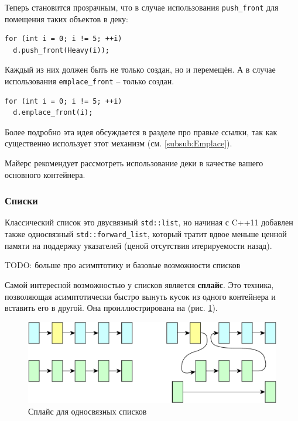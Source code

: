 \documentclass[a4paper,12pt,oneside]{article}
\begin{document}
Теперь становится прозрачным, что в случае использования \lstinline!push_front! для помещения таких объектов в деку:

\begin{lstlisting}
for (int i = 0; i != 5; ++i)
  d.push_front(Heavy(i));
\end{lstlisting}

Каждый из них должен быть не только создан, но и перемещён. А в случае использования \lstinline!emplace_front! -- только создан.

\begin{lstlisting}
for (int i = 0; i != 5; ++i)
  d.emplace_front(i);
\end{lstlisting}

Более подробно эта идея обсуждается в разделе про правые ссылки, так как существенно использует этот механизм (см. \ref{subsub:Emplace}).

Майерс \cite{effmoderncpp} рекомендует рассмотреть использование деки в качестве вашего основного контейнера.

\subsubsection{Списки}

Классический список это двусвязный \lstinline!std::list!, но начиная с C++11 добавлен также односвязный \lstinline!std::forward_list!, который тратит вдвое меньше ценной памяти на поддержку указателей (ценой отсутствия итерируемости назад).

TODO: больше про асимптотику и базовые возможности списков

Самой интересной возможностью у списков является \textbf{сплайс}. Это техника, позволяющая асимптотически быстро вынуть кусок из одного контейнера и вставить его в другой. Она проиллюстрирована на (рис. \ref{fig:list_splice}).

\begin{figure}[h!]
\centering
\includegraphics[width=1.0\textwidth]{illustrations/list-splice-crop.pdf}
\caption{Сплайс для односвязных списков}
\label{fig:list_splice}
\end{figure}
\end{document}

